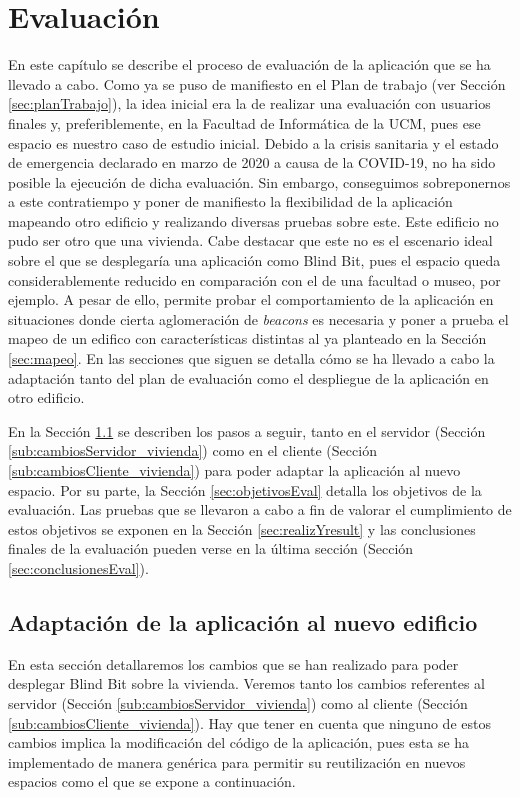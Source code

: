 \chapter{Evaluación}
\label{cap:evaluacion}

En este capítulo se describe el proceso de evaluación de la aplicación que se ha llevado a cabo. Como ya se puso de manifiesto en el Plan de trabajo (ver Sección \ref{sec:planTrabajo}), la idea inicial era la de realizar una evaluación con usuarios finales y, preferiblemente, en la Facultad de Informática de la UCM, pues ese espacio es nuestro caso de estudio inicial. Debido a la crisis sanitaria y el estado de emergencia declarado en marzo de 2020 a causa de la COVID-19, no ha sido posible la ejecución de dicha evaluación. Sin embargo, conseguimos sobreponernos a este contratiempo y poner de manifiesto la flexibilidad de la aplicación mapeando otro edificio y realizando diversas pruebas sobre este. Este edificio no pudo ser otro que una vivienda. Cabe destacar que este no es el escenario ideal sobre el que se desplegaría una aplicación como Blind Bit, pues el espacio queda considerablemente reducido en comparación con el de una facultad o museo, por ejemplo. A pesar de ello, permite probar el comportamiento de la aplicación en situaciones donde cierta aglomeración de \textit{beacons} es necesaria y poner a prueba el mapeo de un edifico con características distintas al ya planteado en la Sección \ref{sec:mapeo}. En las secciones que siguen se detalla cómo se ha llevado a cabo la adaptación tanto del plan de evaluación como el despliegue de la aplicación en otro edificio.

En la Sección \ref{sec:adaptacionApp} se describen los pasos a seguir, tanto en el servidor (Sección \ref{sub:cambiosServidor_vivienda}) como en el cliente (Sección \ref{sub:cambiosCliente_vivienda}) para poder adaptar la aplicación al nuevo espacio. Por su parte, la Sección \ref{sec:objetivosEval} detalla los objetivos de la evaluación. Las pruebas que se llevaron a cabo a fin de valorar el cumplimiento de estos objetivos se exponen en la Sección \ref{sec:realizYresult} y las conclusiones finales de la evaluación pueden verse en la última sección (Sección \ref{sec:conclusionesEval}).


\section{Adaptación de la aplicación al nuevo edificio}
\label{sec:adaptacionApp}

En esta sección detallaremos los cambios que se han realizado para poder desplegar Blind Bit sobre la vivienda. Veremos tanto los cambios referentes al servidor (Sección \ref{sub:cambiosServidor_vivienda}) como al cliente (Sección \ref{sub:cambiosCliente_vivienda}). Hay que tener en cuenta que ninguno de estos cambios implica la modificación del código de la aplicación, pues esta se ha implementado de manera genérica para permitir su reutilización en nuevos espacios como el que se expone a continuación.


